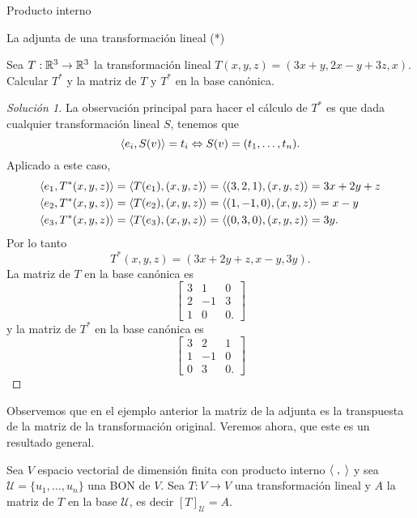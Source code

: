 \begin{chapter}{Producto interno}
\begin{section}{La adjunta de una transformaci\'on lineal (*)}
        
        \begin{ejemplo*}\label{ejemplo4.10}
            Sea $T: \mathbb R^3 \to \mathbb R^3$ la transformación lineal $T(x,y,z) = (3x +y, 2x -y+ 3z, x)$. Calcular $T^*$ y la matriz de $T$ y $T^*$ en la base canónica.  
        \end{ejemplo*}
        \begin{proof}[Solución 1] 
            La observación principal para hacer el cálculo de $T^*$ es que dada cualquier transformación lineal $S$, tenemos que 
            $$
            \langle e_i, S(v)\rangle  = t_i \Leftrightarrow S(v) = (t_1,\ldots,t_n). 
            $$ 
            Aplicado a este caso,
            \begin{align*}
            \langle e_1, T^*(x,y,z)\rangle  &= \langle  T(e_1),(x,y,z)\rangle =    \langle (3,2,1),(x,y,z)\rangle = 3x+2y+z \\
            \langle e_2, T^*(x,y,z)\rangle  &= \langle  T(e_2),(x,y,z)\rangle =    \langle (1,-1,0),(x,y,z)\rangle = x-y \\
            \langle e_3, T^*(x,y,z)\rangle  &= \langle  T(e_3),(x,y,z)\rangle =    \langle (0,3,0),(x,y,z)\rangle = 3y. \\
            \end{align*}
            Por lo tanto
            $$
            T^*(x,y,z) = (3x+2y+z,x-y,3y).
            $$
            La matriz de $T$ en la base canónica es 
            $$
            \left[\begin{matrix}
            3&1&0\\2&-1&3\\1&0&0.
            \end{matrix}
            \right]
            $$
            y la matriz de $T^*$ en la base canónica es
            $$
            \left[\begin{matrix}
            3&2&1\\1&-1&0\\0&3&0.
            \end{matrix}
            \right]
            $$
        \end{proof}
        
        
        Observemos que en el ejemplo anterior la matriz de la adjunta es la transpuesta de la matriz de la transformación original. Veremos ahora, que este es un resultado general. 
        
        \begin{teorema}\label{matrizadjunta}
            Sea $V$ espacio vectorial de dimensión finita con producto interno $\langle \;,\;\rangle$ y sea  $\mathcal U = \{u_1, \ldots , u_n\}$ una BON de $V$. Sea $T: V \to V$ una transformación lineal y $A$ la matriz de $T$ en  la base $\mathcal U$,  es decir $[T]_{\mathcal U} = A$.
            

\end{teorema}
\end{section}
\end{chapter}
